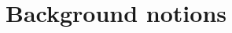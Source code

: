 \documentclass[
	aps, pra,
	superscriptaddress, twocolumn,
	floatfix,
	10pt
]{revtex4-1}
\begin{document}




\section{Background notions}
\label{sec:overview}
\end{document}

